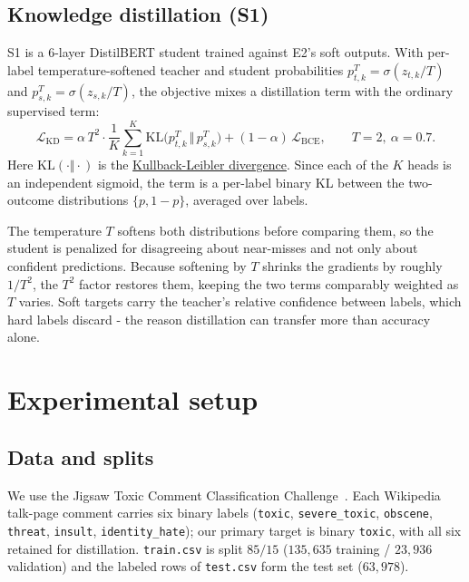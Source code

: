 \documentclass[10pt,a4paper]{article}
\begin{document}
\subsection{Knowledge distillation (S1)}

S1 is a $6$-layer DistilBERT student trained against E2's soft outputs. With per-label
temperature-softened teacher and student probabilities $p^{T}_{t,k}=\sigma(z_{t,k}/T)$ and
$p^{T}_{s,k}=\sigma(z_{s,k}/T)$, the objective mixes a distillation term with the ordinary
supervised term:
\begin{equation}
\mathcal{L}_{\mathrm{KD}}
= \alpha\,T^{2}\cdot\frac{1}{K}\sum_{k=1}^{K}\mathrm{KL}\bigl(p^{T}_{t,k}\,\Vert\,p^{T}_{s,k}\bigr)
+ (1-\alpha)\,\mathcal{L}_{\mathrm{BCE}},
\qquad T=2,\ \alpha=0.7 .
\label{eq:kd}
\end{equation}
Here $\mathrm{KL}(\cdot\Vert\cdot)$ is the
\href{https://en.wikipedia.org/wiki/Kullback-Leibler_divergence}{Kullback-Leibler
divergence}. Since each of the $K$ heads
is an independent sigmoid, the term is a per-label binary KL between the two-outcome
distributions $\{p,1-p\}$, averaged over labels.

The temperature $T$ softens both distributions before comparing them, so the student is
penalized for disagreeing about near-misses and not only about confident predictions. Because softening by $T$ shrinks the gradients by roughly $1/T^{2}$, the $T^{2}$ factor
restores them, keeping the two terms comparably weighted as $T$ varies. Soft targets carry
the teacher's relative confidence between labels, which hard labels discard - the reason
distillation can transfer more than accuracy alone.


\section{Experimental setup}
\label{sec:setup}
\subsection{Data and splits}

We use the Jigsaw Toxic Comment Classification Challenge~\cite{jigsaw2018}. Each
Wikipedia talk-page comment carries six binary labels (\texttt{toxic},
\texttt{severe\_toxic}, \texttt{obscene}, \texttt{threat}, \texttt{insult},
\texttt{identity\_hate}); our primary target is binary \texttt{toxic}, with all six
retained for distillation. \texttt{train.csv} is split $85/15$
($135{,}635$ training / $23{,}936$ validation) and the labeled rows of \texttt{test.csv} form the test
set ($63{,}978$).
\end{document}
